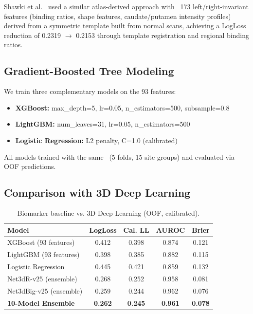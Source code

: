 Shawki et al.~\cite{shawki2024dat} used a similar atlas-derived approach with ~173 left/right-invariant features (binding ratios, shape features, caudate/putamen intensity profiles) derived from a symmetric template built from normal scans, achieving a LogLoss reduction of 0.2319 $\to$ 0.2153 through template registration and regional binding ratios.

\subsection{Gradient-Boosted Tree Modeling}
\label{sec:gbt_modeling}

We train three complementary models on the 93 features:
\begin{itemize}
    \item \textbf{XGBoost:} max\_depth=5, lr=0.05, n\_estimators=500, subsample=0.8
    \item \textbf{LightGBM:} num\_leaves=31, lr=0.05, n\_estimators=500
    \item \textbf{Logistic Regression:} L2 penalty, C=1.0 (calibrated)
\end{itemize}

All models trained with the same \cvname~(5 folds, 15 site groups) and evaluated via OOF predictions.

\subsection{Comparison with 3D Deep Learning}
\label{sec:biomarker_comparison}

\begin{table}[htbp]
\centering
\caption{Biomarker baseline vs. 3D Deep Learning (OOF, calibrated).}
\label{tab:biomarker_comparison}
\begin{tabular}{lcccc}
\toprule
\textbf{Model} & \textbf{LogLoss} & \textbf{Cal. LL} & \textbf{AUROC} & \textbf{Brier} \\
\midrule
XGBoost (93 features) & 0.412 & 0.398 & 0.874 & 0.121 \\
LightGBM (93 features) & 0.398 & 0.385 & 0.882 & 0.115 \\
Logistic Regression & 0.445 & 0.421 & 0.859 & 0.132 \\
\midrule
Net3dR-v25 (ensemble) & 0.268 & 0.252 & 0.958 & 0.081 \\
Net3dBig-v25 (ensemble) & 0.259 & 0.244 & 0.962 & 0.076 \\
\textbf{10-Model Ensemble} & \textbf{0.262} & \textbf{0.245} & \textbf{0.961} & \textbf{0.078} \\
\bottomrule
\end{tabular}
\end{table}

